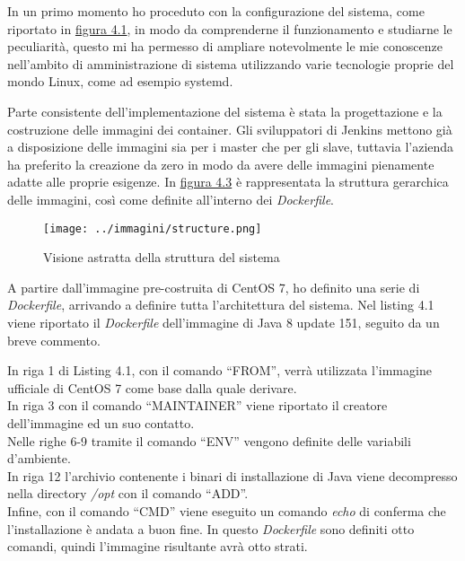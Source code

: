 In un primo momento ho proceduto con la configurazione del sistema, come riportato in \hyperref[fig:impl1]{figura 4.1}, in modo da comprenderne il funzionamento e studiarne le peculiarità, questo mi ha permesso di ampliare notevolmente le mie conoscenze nell'ambito di amministrazione di sistema utilizzando varie tecnologie proprie del mondo \gls{Linux}, come ad esempio \gls{systemd}. 

Parte consistente dell'implementazione del sistema è stata la progettazione e la costruzione delle immagini dei \gls{container}. Gli sviluppatori di Jenkins mettono già a disposizione delle immagini sia per i \gls{master} che per gli \gls{slave}, tuttavia l'azienda ha preferito la creazione da zero in modo da avere delle immagini pienamente adatte alle proprie esigenze. In \hyperref[fig:images]{figura 4.3} è rappresentata la struttura gerarchica delle immagini, così come definite all'interno dei \textit{Dockerfile}\cite{site:dockerfile-reference}.
\begin{figure}[H]
    \capstart
    \centering
    \texttt{[image: ../immagini/structure.png]}
    \caption{Visione astratta della struttura del sistema}
    \label{fig:images}
\end{figure}

A partire dall'immagine pre-costruita di \gls{CentOS} 7, ho definito una serie di \textit{Dockerfile}, arrivando a definire tutta l'architettura del sistema. Nel listing 4.1 viene riportato il \textit{Dockerfile} dell'immagine di Java 8 update 151, seguito da un breve commento.

  

In riga 1 di Listing 4.1, con il comando ``FROM'', verrà utilizzata l'immagine ufficiale di \gls{CentOS} 7 come base dalla quale derivare. \\
In riga 3 con il comando ``MAINTAINER'' viene riportato il creatore dell'immagine ed un suo contatto. \\
Nelle righe 6-9 tramite il comando ``ENV'' vengono definite delle variabili d'ambiente. \\
In riga 12 l'archivio contenente i binari di installazione di Java viene decompresso nella directory \textit{/opt} con il comando ``ADD''. \\
Infine, con il comando ``CMD'' viene eseguito un comando \textit{echo} di conferma che l'installazione è andata a buon fine. In questo \textit{Dockerfile} sono definiti otto comandi, quindi l'immagine risultante avrà otto strati.\\

